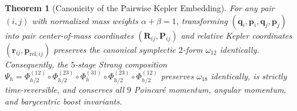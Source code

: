 \documentclass[11pt,a4paper]{article}
\newtheorem{theorem}{Theorem}[section]
\begin{document}
\begin{theorem}[Canonicity of the Pairwise Kepler Embedding]
For any pair $(i,j)$ with normalized mass weights $\alpha + \beta = 1$, transforming $(\mathbf{q}_i, \mathbf{p}_i, \mathbf{q}_j, \mathbf{p}_j)$ into pair center-of-mass coordinates $(\mathbf{R}_{ij}, \mathbf{P}_{ij})$ and relative Kepler coordinates $(\mathbf{r}_{ij}, \mathbf{p}_{\mathrm{rel},ij})$ preserves the canonical symplectic $2$-form $\omega_{12}$ identically. Consequently, the $5$-stage Strang composition $\Psi_h = \Phi_{h/2}^{(12)} \circ \Phi_{h/2}^{(23)} \circ \Phi_h^{(31)} \circ \Phi_{h/2}^{(23)} \circ \Phi_{h/2}^{(12)}$ preserves $\omega_{18}$ identically, is strictly time-reversible, and conserves all $9$ Poincar\'e momentum, angular momentum, and barycentric boost invariants.
\end{theorem}
\end{document}
